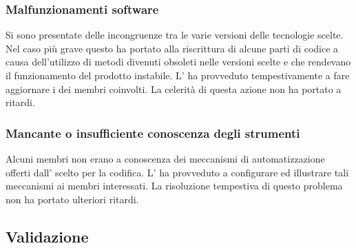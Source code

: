 \documentclass[a4paper, titlepage]{article}
\begin{document}
		\subsubsection{Malfunzionamenti software}
		Si sono presentate delle incongruenze tra le varie versioni delle tecnologie scelte. Nel caso più grave questo ha portato alla riscrittura di alcune parti di codice a causa dell'utilizzo di metodi divenuti obsoleti nelle versioni scelte e che rendevano il funzionamento del prodotto instabile. L' ha provveduto tempestivamente a fare aggiornare i  dei membri coinvolti. La celerità di questa azione non ha portato a ritardi.
		
		\subsubsection{Mancante o insufficiente conoscenza degli strumenti}
		Alcuni membri non erano a conoscenza dei meccanismi di automatizzazione offerti dall' scelto per la codifica.
		L' ha provveduto a configurare ed illustrare tali meccanismi ai membri interessati. La risoluzione tempestiva di questo problema non ha portato ulteriori ritardi.
			
	\subsection{Validazione}
			
\end{document}
